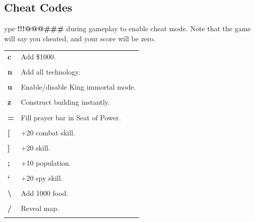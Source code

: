 \subsection{Cheat Codes}



ype \textbf{!!!@@@\#\#\#} during gameplay to enable cheat mode. Note that the game will say you cheated, and your score will be zero.

\begin{tabular}{p{1in} p{3in}}    
    \textbf{c} & Add \$1000. \\ \\        
    \textbf{n} & Add all technology.\\ \\        
    \textbf{u} & Enable/disable King immortal mode.\\ \\        
    \textbf{z} & Construct building instantly.\\ \\        
    \textbf{=} & Fill prayer bar in Seat of Power.\\ \\        
    \textbf{[} & +20 combat skill.\\ \\        
    \textbf{]} & +20 skill.\\ \\        
    \textbf{;} & +10 population.\\ \\        
    \textbf{‘} & +20 spy skill.\\ \\        
    \textbf{\textbackslash} & Add 1000 food.\\ \\        
    \textbf{/} & Reveal map.\\ \\
\end{tabular}